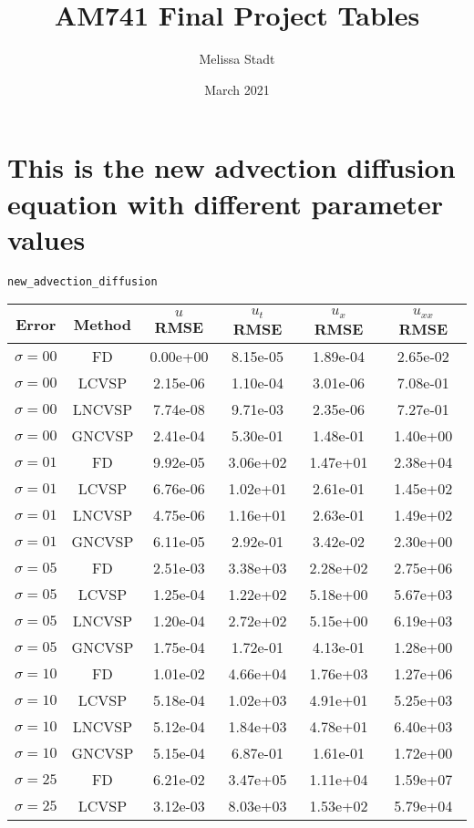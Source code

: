 \documentclass{article}
\title{AM741 Final Project Tables}
\author{Melissa Stadt}
\date{March 2021}
\begin{document}
\section*{This is the new advection diffusion equation with different parameter values}



\verb+new_advection_diffusion+\\
\begin{tabular}{cccccc}
    Error & Method & $u$ RMSE & $u_{t}$ RMSE & $u_{x}$ RMSE & $u_{xx}$ RMSE \\ 
    \hline
    $\sigma = 00$ & FD & 0.00e+00 & 8.15e-05 & 1.89e-04 & 2.65e-02 \\
    $\sigma = 00$ & LCVSP & 2.15e-06 & 1.10e-04 & 3.01e-06 & 7.08e-01 \\
    $\sigma = 00$ & LNCVSP & 7.74e-08 & 9.71e-03 & 2.35e-06 & 7.27e-01 \\
    $\sigma = 00$ & GNCVSP & 2.41e-04 & 5.30e-01 & 1.48e-01 & 1.40e+00 \\
    \hline
    $\sigma = 01$ & FD & 9.92e-05 & 3.06e+02 & 1.47e+01 & 2.38e+04 \\
    $\sigma = 01$ & LCVSP & 6.76e-06 & 1.02e+01 & 2.61e-01 & 1.45e+02 \\
    $\sigma = 01$ & LNCVSP & 4.75e-06 & 1.16e+01 & 2.63e-01 & 1.49e+02 \\
    $\sigma = 01$ & GNCVSP & 6.11e-05 & 2.92e-01 & 3.42e-02 & 2.30e+00 \\
    \hline
    $\sigma = 05$ & FD & 2.51e-03 & 3.38e+03 & 2.28e+02 & 2.75e+06 \\
    $\sigma = 05$ & LCVSP & 1.25e-04 & 1.22e+02 & 5.18e+00 & 5.67e+03 \\
    $\sigma = 05$ & LNCVSP & 1.20e-04 & 2.72e+02 & 5.15e+00 & 6.19e+03 \\
    $\sigma = 05$ & GNCVSP & 1.75e-04 & 1.72e-01 & 4.13e-01 & 1.28e+00 \\
    \hline
    $\sigma = 10$ & FD & 1.01e-02 & 4.66e+04 & 1.76e+03 & 1.27e+06 \\
    $\sigma = 10$ & LCVSP & 5.18e-04 & 1.02e+03 & 4.91e+01 & 5.25e+03 \\
    $\sigma = 10$ & LNCVSP & 5.12e-04 & 1.84e+03 & 4.78e+01 & 6.40e+03 \\
    $\sigma = 10$ & GNCVSP & 5.15e-04 & 6.87e-01 & 1.61e-01 & 1.72e+00 \\
    \hline
    $\sigma = 25$ & FD & 6.21e-02 & 3.47e+05 & 1.11e+04 & 1.59e+07 \\
    $\sigma = 25$ & LCVSP & 3.12e-03 & 8.03e+03 & 1.53e+02 & 5.79e+04 \\

\end{tabular}
\end{document}
